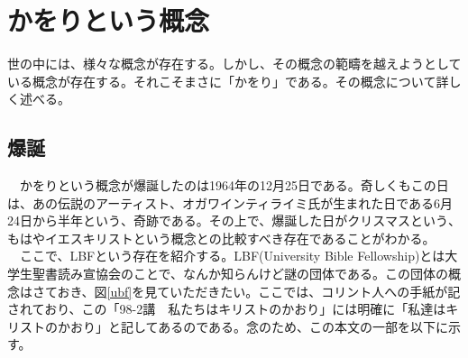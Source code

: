 
\section{かをりという概念}
世の中には、様々な概念が存在する。しかし、その概念の範疇を越えようとしている概念が存在する。それこそまさに「かをり」である。その概念について詳しく述べる。

\subsection{爆誕}
　かをりという概念が爆誕したのは1964年の12月25日である。奇しくもこの日は、あの伝説のアーティスト、オガワインティライミ氏が生まれた日である6月24日から半年という、奇跡である。その上で、爆誕した日がクリスマスという、もはやイエスキリストという概念との比較すべき存在であることがわかる。\\
　ここで、LBFという存在を紹介する。LBF(University Bible Fellowship)とは大学生聖書読み宣協会のことで、なんか知らんけど謎の団体である。この団体の概念はさておき、図\ref{ubf}を見ていただきたい。ここでは、コリント人への手紙が記されており、この「98-2講　私たちはキリストのかおり」には明確に「私達はキリストのかおり」と記してあるのである。念のため、この本文の一部を以下に示す。\\

